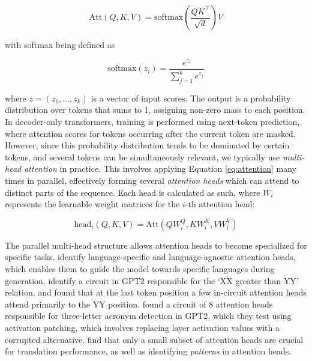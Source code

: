 \documentclass[11pt]{article}
\begin{document}
\begin{equation}\label{eq:attention}
\text{Att}(Q, K, V) = \text{softmax} \left( \frac{QK^{\top}}{\sqrt{d}} \right) V
\end{equation}

\noindent
with softmax being defined as

\begin{equation}\label{eq:softmax}
\text{softmax}(z_i) = \frac{e^{z_i}}{\sum_{j=1}^{k} e^{z_j}}
\end{equation}

\noindent
where $z = (z_1, \dots, z_k)$ is a vector of input scores. The output is a probability distribution over tokens that sums to 1, assigning non-zero mass to each position.
In decoder-only transformers, training is performed using next-token prediction, where attention scores for tokens occurring after the current token are masked. However, since this probability distribution tends to be dominated by certain tokens, and several tokens can be simultaneously relevant, we typically use \textit{multi-head attention} in practice. This involves applying Equation \ref{eq:attention} many times in parallel, effectively forming several \textit{attention heads} which can attend to distinct parts of the sequence. Each head is calculated as such, where $W_i$ represents the learnable weight matrices for the $i$-th attention head:

\begin{equation}\label{eq:multihead}
\text{head}_i (Q, K, V) = \text{Att}(QW_i^{Q}, KW_i^{K}, VW_i^{V})
\end{equation}


The parallel multi-head structure allows attention heads to become specialized for specific tasks. \citet{liu2025_language_attention_heads} identify language-specific and language-agnostic attention heads, which enables them to guide the model towards specific languages during generation. \citet{hanna2023} identify a circuit in GPT2 responsible for the `XX greater than YY' relation, and found that at the last token position a few in-circuit attention heads attend primarily to the YY position.
\citet{carrasco2024} found a circuit of 8 attention heads responsible for three-letter acronym detection in GPT2, which they test using activation patching, which involves replacing layer activation values with a corrupted alternative. \citet{voita2019} find that only a small subset of attention heads are crucial for translation performance, as well as identifying \textit{patterns} in attention heads.
\end{document}
